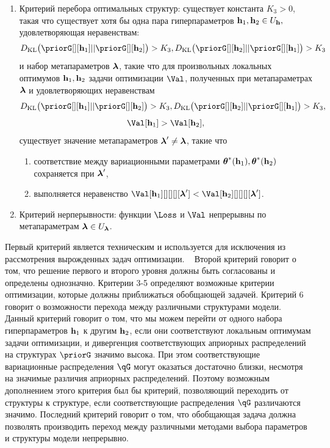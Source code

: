 \begin{defin}
\begin{enumerate}
\item Критерий перебора оптимальных структур: существует константа $K_3>0$, такая что существует хотя бы одна пара гиперпараметров $\mathbf{h}_1, \mathbf{h}_2 \in U_{\mathbf{h}},$ удовлетворяющая неравенствам:
$$\KL{\priorG[][\h_1]}{\priorG[][\h_2]} > K_3,\KL{\priorG[][\h_2]}{\priorG[][\h_1]}>K_3$$ и набор метапараметров $\boldsymbol{\lambda}$, такие что для произвольных локальных оптимумов  $\mathbf{h}_1,\mathbf{h}_2$ задачи оптимизации $\Val$, полученных при метапараметрах $\boldsymbol{\lambda}$ и удовлетворяющих неравенствам $$\KL{\priorG[][\h_1]}{\priorG[][\h_2]} > K_3, \KL{\priorG[][\h_2]}{\priorG[][\h_1]}>K_3,$$$$\Val[\h_1] > \Val[\h_2],$$  существует значение метапараметров $\boldsymbol{\lambda}' \neq \boldsymbol{\lambda}$, такие что
\begin{enumerate}
\item соответствие между вариационными параметрами $\boldsymbol{\theta}^{*}(\mathbf{h}_1),\boldsymbol{\theta}^{*}(\mathbf{h}_2)$ сохраняется при  $\boldsymbol{\lambda}'$,
\item выполняется неравенство $\Val[\h_1][][][][\lam'] < \Val[\h_2][][][][\lam']$.
\end{enumerate}


\item Критерий нерперывности: функции $\Loss$ и $\Val$ непрерывны по метапараметрам $\boldsymbol{\lambda} \in U_{\boldsymbol{\lambda}}$.
\end{enumerate}
\end{defin}
Первый критерий является техническим и используется для исключения из рассмотрения вырожденных задач оптимизации.  
Второй критерий говорит о том, что решение первого и второго уровня должны быть согласованы и определены однозначно.
Критерии 3-5 определяют возможные критерии оптимизации, которые должны приближаться обобщающей задачей.
Критерий 6 говорит о возможности перехода между различными структурами модели. Данный критерий говорит о том, что мы можем перейти от одного набора гиперпараметров $\mathbf{h}_1$ к другим $\mathbf{h}_2$, если они соответствуют локальным оптимумам задачи оптимизации, и дивергенция соответствующих априорных  распределений на структурах $\priorG$ значимо высока. При этом соответствующие вариационные распределения $\qG$ могут оказаться достаточно близки, несмотря на значимые различия априорных распределений. Поэтому возможным дополнением этого критерия был бы критерий, позволяющий переходить от структуры к структуре, если соответствующие распределения $\qG$ различаются значимо.
Последний критерий говорит о том, что обобщающая задача должна позволять производить переход между различными методами выбора  параметров и структуры модели непрерывно.

